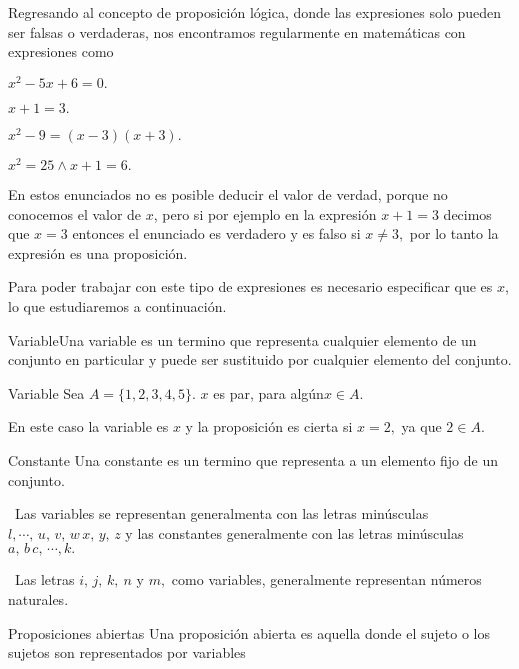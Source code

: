Regresando al concepto de proposición lógica, donde las expresiones
solo pueden ser falsas o verdaderas, nos encontramos regularmente
en matemáticas con expresiones como 

\begin{lista}

\item $x^{2}-5x+6=0.$

\item $x+1=3.$

\item $x^{2}-9=\left(x-3\right)\left(x+3\right).$

\item $x^{2}=25\wedge x+1=6.$

\end{lista}

En estos enunciados no es posible deducir el valor de verdad, porque
no conocemos el valor de $x$, pero si por ejemplo en la expresión
$x+1=3$ decimos que $x=3$ entonces el enunciado es verdadero y es
falso si $x\neq3,$ por lo tanto la expresión es una proposición.

Para poder trabajar con este tipo de expresiones es necesario especificar
que es $x$, lo que estudiaremos a continuación.

\begin{definicionn}{Variable}Una variable es un termino que representa
cualquier elemento de un conjunto en particular y puede ser sustituido
por cualquier elemento del conjunto.\end{definicionn}

\begin{ejem}{Variable} Sea $A=\{1,2,3,4,5\}$. $x$ es par, para
algún$x\in A$.

En este caso la variable es $x$ y la proposición es cierta si $x=2,$
ya que $2\in A.$\end{ejem}

\begin{definicionn}{Constante} Una constante es un termino que representa
a un elemento fijo de un conjunto. \end{definicionn}

\notacion\ Las variables se representan generalmenta con las letras
minúsculas $l,\cdots,\, u,\, v,\, w\, x,\, y,\, z$ y las constantes
generalmente con las letras minúsculas $a,\, b\, c,\,\cdots,k.$

\nota\ Las letras $i,\, j,\, k,\: n$ y $m,$ como variables, generalmente
representan números naturales.

\begin{definicionn}{Proposiciones abiertas} Una proposición abierta
es aquella donde el sujeto o los sujetos son representados por variables\end{definicionn}

